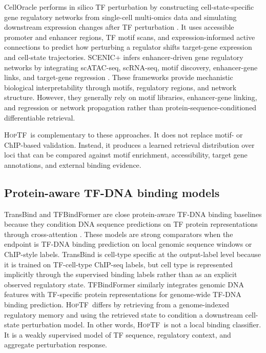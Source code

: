 \documentclass[11pt]{article}
\newcommand{\hoptf}{\textsc{HopTF}}
\begin{document}
CellOracle performs in silico TF perturbation by constructing cell-state-specific gene regulatory networks from single-cell multi-omics data and simulating downstream expression changes after TF perturbation \citep{kamimoto2023}. It uses accessible promoter and enhancer regions, TF motif scans, and expression-informed active connections to predict how perturbing a regulator shifts target-gene expression and cell-state trajectories. SCENIC+ infers enhancer-driven gene regulatory networks by integrating scATAC-seq, scRNA-seq, motif discovery, enhancer-gene links, and target-gene regression \citep{gonzalezblas2023}. These frameworks provide mechanistic biological interpretability through motifs, regulatory regions, and network structure. However, they generally rely on motif libraries, enhancer-gene linking, and regression or network propagation rather than protein-sequence-conditioned differentiable retrieval.

\hoptf\ is complementary to these approaches. It does not replace motif- or ChIP-based validation. Instead, it produces a learned retrieval distribution over loci that can be compared against motif enrichment, accessibility, target gene annotations, and external binding evidence.

\subsection{Protein-aware TF-DNA binding models}

TransBind and TFBindFormer are close protein-aware TF-DNA binding baselines because they condition DNA sequence predictions on TF protein representations through cross-attention \citep{basnet2026,liutfbindformer2026}. These models are strong comparators when the endpoint is TF-DNA binding prediction on local genomic sequence windows or ChIP-style labels. TransBind is cell-type specific at the output-label level because it is trained on TF-cell-type ChIP-seq labels, but cell type is represented implicitly through the supervised binding labels rather than as an explicit observed regulatory state. TFBindFormer similarly integrates genomic DNA features with TF-specific protein representations for genome-wide TF-DNA binding prediction. \hoptf\ differs by retrieving from a genome-indexed regulatory memory and using the retrieved state to condition a downstream cell-state perturbation model. In other words, \hoptf\ is not a local binding classifier. It is a weakly supervised model of TF sequence, regulatory context, and aggregate perturbation response.
\end{document}
